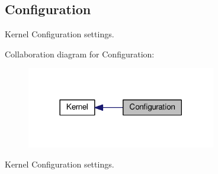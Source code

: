 \hypertarget{group__kern__cfg}{\subsection{Configuration}
\label{group__kern__cfg}
}


Kernel Configuration settings.  


Collaboration diagram for Configuration\-:\nopagebreak
\begin{figure}[H]
\begin{center}
\leavevmode
\includegraphics[width=234pt]{group__kern__cfg}
\end{center}
\end{figure}
Kernel Configuration settings. 